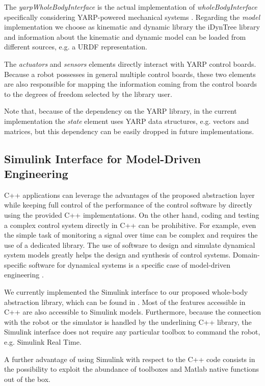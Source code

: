 The \emph{yarpWholeBodyInterface} is the actual implementation of \emph{wholeBodyInterface} specifically considering YARP-powered mechanical systems \cite{metta2006yarp}.
Regarding the \emph{model} implementation we choose as kinematic and dynamic library the iDynTree library \cite{Frontiers2015} and information about the kinematic and dynamic model can be loaded from different sources, e.g. a URDF representation.

The \emph{actuators} and \emph{sensors} elements directly interact with YARP control boards.
Because a robot possesses in general multiple control boards, these two elements are also responsible for mapping the information coming from the control boards to the degrees of freedom selected by the library user.

Note that, because of the dependency on the YARP library, in the current implementation the \emph{state} element uses YARP data structures, e.g. vectors and matrices, but this dependency can be easily dropped in future implementations.



\subsection{Simulink Interface for Model-Driven Engineering} %
\label{sub:simulink_interface}

C++ applications can leverage the advantages of the proposed abstraction layer while keeping full control of the performance of the control software by directly using the provided C++ implementations.
On the other hand, coding and testing a complex control system directly in C++ can be prohibitive.
For example, even the simple task of monitoring a signal over time can be complex and requires the use of a dedicated library.
The use of software to design and simulate dynamical system models greatly helps the design and synthesis of control systems. 
Domain-specific software for dynamical systems is a specific case of model-driven engineering \cite{brugali2015}.

We currently implemented the Simulink interface to our proposed whole-body abstraction library, which can be found in \cite{WBToolbox}.
Most of the features accessible in C++ are also accessible to Simulink models.
Furthermore, because the connection with the robot or the simulator is handled by the underlining C++ library, the Simulink interface does not require any particular toolbox to command the robot, e.g. Simulink Real Time\textsuperscript{\textregistered}.


A further advantage of using Simulink\textsuperscript{\textregistered} with respect to the C++ code consists in the possibility to exploit the abundance of toolboxes and Matlab native functions out of the box.


